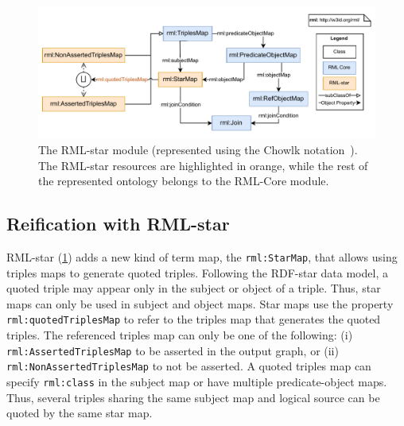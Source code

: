 


\begin{figure}[!t]
\centering
\includegraphics[width=1\linewidth]{figures/chp4-3_rml-star_diagram.pdf}
\caption[RML-star module]{The \mbox{RML-star} module (represented using the Chowlk notation~\parencite{feria2022chowlk}). The RML-star resources are highlighted in orange, while the rest of the represented ontology belongs to the RML-Core module.}
\label{fig:chp4-3_rml-star}
\end{figure}

\subsection{Reification with RML-star}
\label{sec:chp4_reif_mappings}



\mbox{RML-star} (\cref{fig:chp4-3_rml-star}) adds a new kind of term map, the \texttt{rml:StarMap}, that allows using triples maps to generate quoted triples. 
Following the \mbox{RDF-star} data model,
a quoted triple may appear only in the subject or object of a triple.
Thus, star maps can only be used in subject and object maps.
Star maps use the property \texttt{rml:quotedTriplesMap} to refer to the triples map that generates the quoted triples. 
The referenced triples map can only be one of the following: (i) \texttt{rml:AssertedTriplesMap} to be asserted in the output graph, or (ii) \texttt{rml:NonAssertedTriplesMap} to not be asserted. A quoted triples map can specify \texttt{rml:class} in the subject map or have multiple predicate-object maps.
Thus, several triples sharing the same subject map and logical source can be quoted by the same star map.







